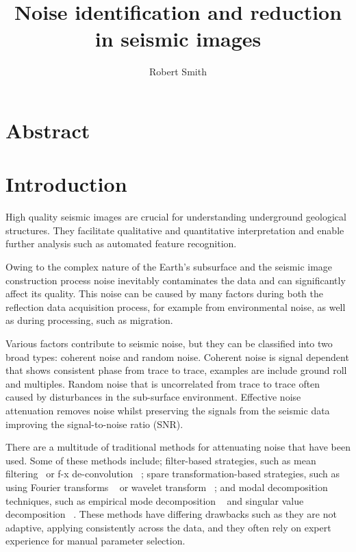 \documentclass[project-plan]{report-template}
\title{Noise identification and reduction in seismic images}
\author{Robert Smith}
\begin{document}
\maketitlepage  %

\section*{Abstract}
\blindtext  %

\newpage
\tableofcontents
\newpage

\section{Introduction}
High quality seismic images are crucial for understanding underground geological structures. They facilitate qualitative and quantitative interpretation and enable further analysis such as automated feature recognition.

Owing to the complex nature of the Earth's subsurface and the seismic image construction process noise inevitably contaminates the data and can significantly affect its quality. This noise can be caused by many factors during both the reflection data acquisition process, for example from environmental noise, as well as during processing, such as migration. 

Various factors contribute to seismic noise, but they can be classified into two broad types: coherent noise and random noise. Coherent noise is signal dependent that shows consistent phase from trace to trace, examples are include ground roll and multiples. Random noise that is uncorrelated from trace to trace often caused by disturbances in the sub-surface environment. Effective noise attenuation removes noise whilst preserving the signals from the seismic data improving the signal-to-noise ratio (SNR).

There are a multitude of traditional methods for attenuating noise that have been used. Some of these methods include; filter-based strategies, such as mean filtering~\cite{Liu20062d} or f-x de-convolution ~\cite{hornbostel1991spatial}; spare transformation-based strategies, such as using Fourier transforms ~\cite{alsdorf1997noise} or wavelet transform ~\cite{Albert2009wavelet}; and modal decomposition techniques, such as empirical mode decomposition ~\cite{bekara2009random} and singular value decomposition ~\cite{bekara2007local}. These methods have differing drawbacks such as they are not adaptive, applying consistently across the data, and they often rely on expert experience for manual parameter selection.
\end{document}
